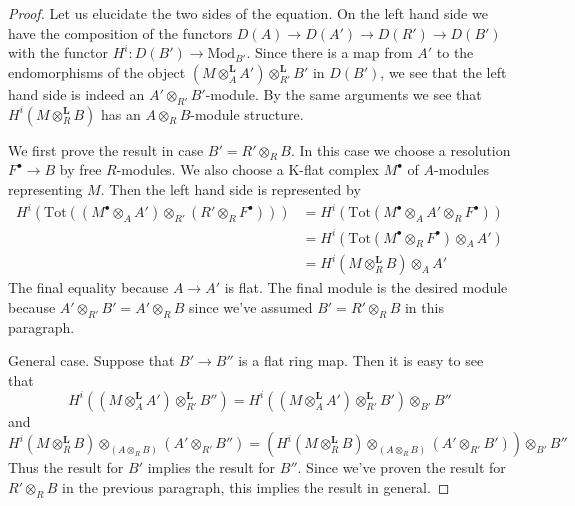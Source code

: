 \documentclass[10pt,a4paper]{amsart}
\theoremstyle{plain}
\theoremstyle{definition}
\theoremstyle{remark}
\numberwithin{equation}{subsection}
\begin{document}
\begin{proof}
Let us elucidate the two sides of the equation. On the left hand side
we have the composition of the functors
$D(A) \to D(A') \to D(R') \to D(B')$ with the functor
$H^i : D(B') \to \text{Mod}_{B'}$. Since there is
a map from $A'$ to the endomorphisms of the object
$(M \otimes_A^\mathbf{L} A') \otimes_{R'}^\mathbf{L} B'$
in $D(B')$, we see that the left hand side is indeed
an $A' \otimes_{R'} B'$-module. By the same arguments
we see that $H^i(M \otimes_R^\mathbf{L} B)$
has an $A \otimes_R B$-module structure.

\medskip\noindent
We first prove the result in case $B' = R' \otimes_R B$.
In this case we choose a resolution $F^\bullet \to B$
by free $R$-modules. We also choose a K-flat complex
$M^\bullet$ of $A$-modules representing $M$.
Then the left hand side is represented by
\begin{align*}
H^i(\text{Tot}((M^\bullet \otimes_A A') \otimes_{R'} (R' \otimes_R F^\bullet)))
& =
H^i(\text{Tot}(M^\bullet \otimes_A A' \otimes_R F^\bullet)) \\
& =
H^i(\text{Tot}(M^\bullet \otimes_R F^\bullet) \otimes_A A') \\
& =
H^i(M \otimes_R^\mathbf{L} B) \otimes_A A'
\end{align*}
The final equality because $A \to A'$ is flat. The final module
is the desired module because $A' \otimes_{R'} B' = A' \otimes_R B$
since we've assumed $B' = R' \otimes_R B$ in this paragraph.

\medskip\noindent
General case. Suppose that $B' \to B''$ is a flat ring map.
Then it is easy to see that
$$
H^i((M \otimes_A^\mathbf{L} A') \otimes_{R'}^\mathbf{L} B'') =
H^i((M \otimes_A^\mathbf{L} A') \otimes_{R'}^\mathbf{L} B')
\otimes_{B'} B''
$$
and
$$
H^i(M \otimes_R^\mathbf{L} B) \otimes_{(A \otimes_R B)} (A' \otimes_{R'} B'')
=
\left(
H^i(M \otimes_R^\mathbf{L} B) \otimes_{(A \otimes_R B)} (A' \otimes_{R'} B')
\right) \otimes_{B'} B''
$$
Thus the result for $B'$ implies the result for $B''$. Since we've
proven the result for $R' \otimes_R B$ in the previous paragraph,
this implies the result in general.
\end{proof}
\end{document}
